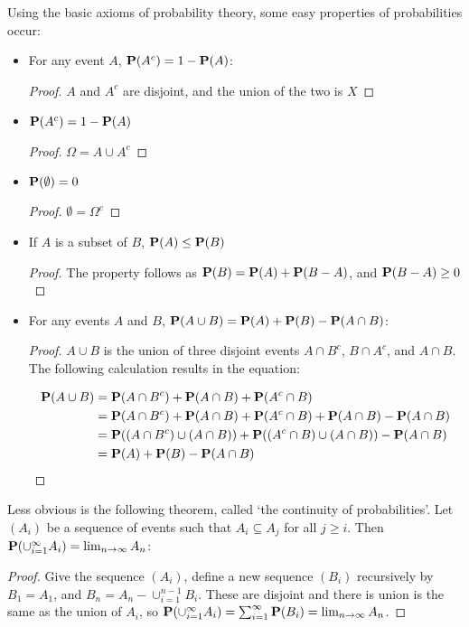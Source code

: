 Using the basic axioms of probability theory, some easy properties of probabilities occur:
\begin{itemize}
    \item For any event $A$, $\operatorname{\mathbf{P}}(A^c) = 1 - \operatorname{\mathbf{P}}(A)$:
    \begin{proof} $A$ and $A^c$ are disjoint, and the union of the two is $X$ \end{proof}

    \item $\operatorname{\mathbf{P}}(A^c) = 1 - \operatorname{\mathbf{P}}(A)$
    \begin{proof} $\Omega = A \cup A^c$ \end{proof}

    \item $\operatorname{\mathbf{P}}(\emptyset) = 0$
    \begin{proof} $\emptyset = \Omega^c$ \end{proof}

    \item If $A$ is a subset of $B$, $\operatorname{\mathbf{P}}(A) \leq \operatorname{\mathbf{P}}(B)$
    \begin{proof} The property follows as $\operatorname{\mathbf{P}}(B) = \operatorname{\mathbf{P}}(A) + \operatorname{\mathbf{P}}(B - A)$, and $\operatorname{\mathbf{P}}(B - A) \geq 0$ \end{proof}

    \item For any events $A$ and $B$, $\operatorname{\mathbf{P}}(A \cup B) = \operatorname{\mathbf{P}}(A) + \operatorname{\mathbf{P}}(B) - \operatorname{\mathbf{P}}(A \cap B)$:
    \begin{proof} $A \cup B$ is the union of three disjoint events $A \cap B^c$, $B \cap A^c$, and $A \cap B$. The following calculation results in the equation:

    \begin{align*}
    \operatorname{\mathbf{P}}(A \cup B) &= \operatorname{\mathbf{P}}(A \cap B^c) + \operatorname{\mathbf{P}}(A \cap B) + \operatorname{\mathbf{P}}(A^c \cap B)\\
                    &= \operatorname{\mathbf{P}}(A \cap B^c) + \operatorname{\mathbf{P}}(A \cap B) + \operatorname{\mathbf{P}}(A^c \cap B) + \operatorname{\mathbf{P}}(A \cap B) - \operatorname{\mathbf{P}}(A \cap B)\\
                    &= \operatorname{\mathbf{P}}((A \cap B^c) \cup (A \cap B)) + \operatorname{\mathbf{P}}((A^c \cap B) \cup (A \cap B)) - \operatorname{\mathbf{P}}(A \cap B)\\
                    &= \operatorname{\mathbf{P}}(A) + \operatorname{\mathbf{P}}(B) - \operatorname{\mathbf{P}}(A \cap B)
    \end{align*}
    \end{proof}
\end{itemize}

Less obvious is the following theorem, called `the continuity of probabilities'. Let $(A_i)$ be a sequence of events such that $A_i \subseteq A_j$ for all $j \geq i$. Then $\operatorname{\mathbf{P}}(\cup_{i=1}^\infty A_i) = \lim_{n \to \infty} A_n$:
\begin{proof}
    Give the sequence $(A_i)$, define a new sequence $(B_i)$ recursively by $B_1 = A_1$, and $B_n = A_n - \cup_{i=1}^{n-1} B_i$. These are disjoint and there is union is the same as the union of $A_i$, so $\operatorname{\mathbf{P}}(\cup_{i=1}^\infty A_i) = \sum_{i=1}^\infty \operatorname{\mathbf{P}}(B_i) = \lim_{n \to \infty} A_n$.
\end{proof}

